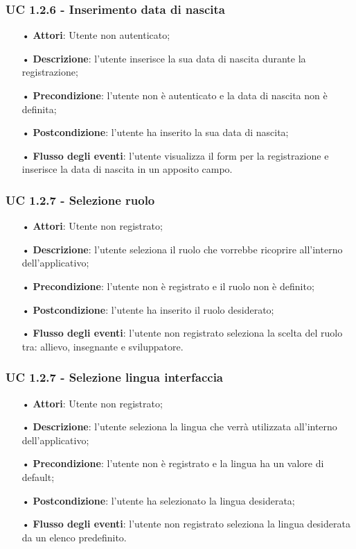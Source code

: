 \subsubsection{UC 1.2.6 - Inserimento data di nascita}
\begin{itemize}
	\item[•]\textbf{Attori}: Utente non autenticato;
	\item[•]\textbf{Descrizione}: l'utente inserisce la sua data di nascita durante la registrazione;
	\item[•]\textbf{Precondizione}: l'utente non è autenticato e la data di nascita non è definita;
	\item[•]\textbf{Postcondizione}: l'utente ha inserito la sua data di nascita;
	\item[•]\textbf{Flusso degli eventi}: l'utente visualizza il form per la registrazione e inserisce la data di nascita in un apposito campo.
\end{itemize}

\subsubsection{UC 1.2.7 - Selezione ruolo}
\begin{itemize}
	\item[•]\textbf{Attori}: Utente non registrato;
	\item[•]\textbf{Descrizione}: l'utente seleziona il ruolo che vorrebbe ricoprire all'interno dell'applicativo;
	\item[•]\textbf{Precondizione}: l'utente non è registrato e il ruolo non è definito;
	\item[•]\textbf{Postcondizione}: l'utente ha inserito il ruolo desiderato;
	\item[•]\textbf{Flusso degli eventi}: l'utente non registrato seleziona la scelta del ruolo tra: allievo, insegnante e sviluppatore.
\end{itemize}

\subsubsection{UC 1.2.7 - Selezione lingua interfaccia}
\begin{itemize}
	\item[•]\textbf{Attori}: Utente non registrato;
	\item[•]\textbf{Descrizione}: l'utente seleziona la lingua che verrà utilizzata all'interno dell'applicativo;
	\item[•]\textbf{Precondizione}: l'utente non è registrato e la lingua ha un valore di default;
	\item[•]\textbf{Postcondizione}: l'utente ha selezionato la lingua desiderata;
	\item[•]\textbf{Flusso degli eventi}: l'utente non registrato seleziona la lingua desiderata da un elenco predefinito.
\end{itemize}

